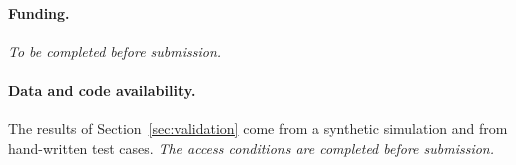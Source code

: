 \documentclass[11pt,a4paper]{article}
\begin{document}
\paragraph{Funding.} \textit{To be completed before submission.}

\paragraph{Data and code availability.} The results of Section~\ref{sec:validation} come from a synthetic
simulation and from hand-written test cases. \textit{The access conditions are completed before submission.}



\end{document}
